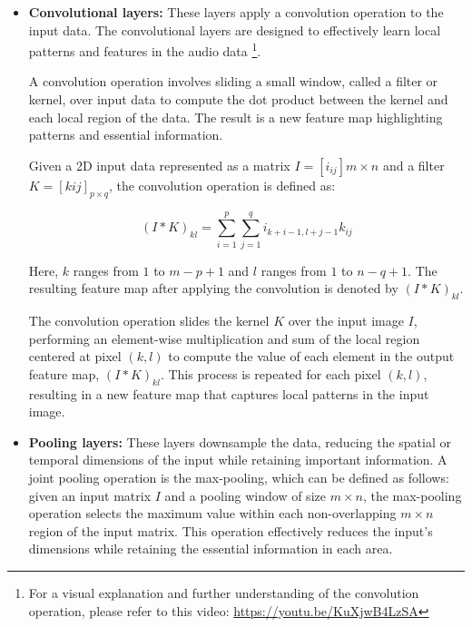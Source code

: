 \begin{itemize}

\item \textbf{Convolutional layers:} These layers apply a convolution operation to the input data. The convolutional layers are designed to effectively learn local patterns and features in the audio data \footnote{For a visual explanation and further understanding of the convolution operation, please refer to this video: \url{https://youtu.be/KuXjwB4LzSA}}.

A convolution operation involves sliding a small window, called a filter or kernel, over input data to compute the dot product between the kernel and each local region of the data. The result is a new feature map highlighting patterns and essential information.

Given a 2D input data represented as a matrix $I = [i_{ij}]{m \times n}$ and a filter $K = [k{ij}]_{p \times q}$, the convolution operation is defined as:

\begin{equation}
    (I * K)_{kl} = \sum_{i=1}^{p} \sum_{j=1}^{q} i_{k+i-1, l+j-1}k_{ij}
\end{equation}

Here, $k$ ranges from $1$ to $m-p+1$ and $l$ ranges from $1$ to $n-q+1$. The resulting feature map after applying the convolution is denoted by $(I * K)_{kl}$.

The convolution operation slides the kernel $K$ over the input image $I$, performing an element-wise multiplication and sum of the local region centered at pixel $(k,l)$ to compute the value of each element in the output feature map, $(I * K)_{kl}$. This process is repeated for each pixel $(k,l)$, resulting in a new feature map that captures local patterns in the input image.




\item \textbf{Pooling layers:} These layers downsample the data, reducing the spatial or temporal dimensions of the input while retaining important information. A joint pooling operation is the max-pooling, which can be defined as follows: given an input matrix $I$ and a pooling window of size $m \times n$, the max-pooling operation selects the maximum value within each non-overlapping $m \times n$ region of the input matrix. This operation effectively reduces the input's dimensions while retaining the essential information in each area.
\vspace*{3mm}


\end{itemize}
